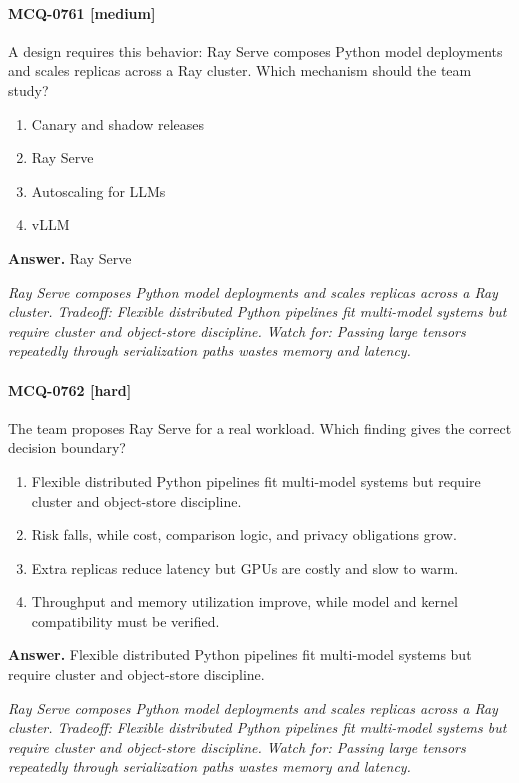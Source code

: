 \paragraph{MCQ-0761 [medium]} A design requires this behavior: Ray Serve composes Python model deployments and scales replicas across a Ray cluster. Which mechanism should the team study?
\begin{enumerate}[label=\Alph*.]
\item Canary and shadow releases
\item Ray Serve
\item Autoscaling for LLMs
\item vLLM
\end{enumerate}
\noindent\textbf{Answer.} Ray Serve
\par\textit{Ray Serve composes Python model deployments and scales replicas across a Ray cluster. Tradeoff: Flexible distributed Python pipelines fit multi-model systems but require cluster and object-store discipline. Watch for: Passing large tensors repeatedly through serialization paths wastes memory and latency.}
\paragraph{MCQ-0762 [hard]} The team proposes Ray Serve for a real workload. Which finding gives the correct decision boundary?
\begin{enumerate}[label=\Alph*.]
\item Flexible distributed Python pipelines fit multi-model systems but require cluster and object-store discipline.
\item Risk falls, while cost, comparison logic, and privacy obligations grow.
\item Extra replicas reduce latency but GPUs are costly and slow to warm.
\item Throughput and memory utilization improve, while model and kernel compatibility must be verified.
\end{enumerate}
\noindent\textbf{Answer.} Flexible distributed Python pipelines fit multi-model systems but require cluster and object-store discipline.
\par\textit{Ray Serve composes Python model deployments and scales replicas across a Ray cluster. Tradeoff: Flexible distributed Python pipelines fit multi-model systems but require cluster and object-store discipline. Watch for: Passing large tensors repeatedly through serialization paths wastes memory and latency.}
